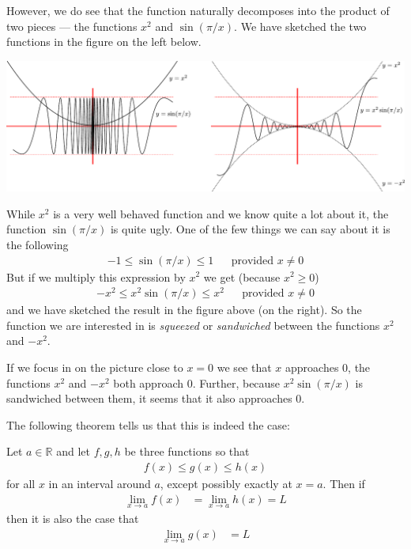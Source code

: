 However, we do see that the function naturally decomposes into the product of
two pieces --- the functions $x^2$ and $\sin(\pi/x)$. We have sketched the two
functions  in the figure on the left below.
\begin{fig}
\begin{center}
 \includegraphics[width=\textwidth]{squeeze1}\\
\end{center}
\end{fig}
While $x^2$ is a very well behaved function and we know quite a lot about it,
the function $\sin(\pi/x)$ is quite ugly. One of the few things we can say
about it is the following
\begin{align*}
  -1 \leq \sin(\pi/x) \leq 1 && \text{provided $x \neq 0$}
\end{align*}
But if we multiply this expression by $x^2$ we get (because $x^2 \geq 0$)
\begin{align*}
  -x^2 \leq x^2\sin(\pi/x) \leq x^2 && \text{provided $x \neq 0$}
\end{align*}
and we have sketched the result in the figure above (on the right). So the
function we are interested in is \emph{squeezed} or \emph{sandwiched} between
the functions $x^2$ and $-x^2$.

If we focus in on the picture close to $x=0$ we see that $x$ approaches $0$,
the functions $x^2$ and $-x^2$ both approach $0$. Further, because
$x^2\sin(\pi/x)$ is sandwiched between them, it seems that it also approaches
$0$.

The following theorem tells us that this is indeed the case:
\begin{theorem}
\label{thm squeeze}
  Let $a \in \mathbb{R}$ and let $f,g,h$ be three functions so that
  \begin{align*}
    f(x) \leq g(x) \leq h(x)
  \end{align*}
  for all $x$ in an interval around $a$, except possibly exactly at $x=a$. Then
if
  \begin{align*}
    \lim_{x \to a} f(x) &= \lim_{x \to a} h(x) = L
  \end{align*}
  then it is also the case that
  \begin{align*}
    \lim_{x \to a} g(x) &= L
  \end{align*}
\end{theorem}

